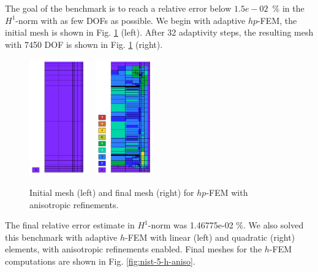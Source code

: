 The goal of the benchmark is to reach a relative error below
$1.5e-02$~\% in the $H^1$-norm with as few DOFs as possible.
We begin with adaptive $hp$-FEM,
the initial mesh is shown in Fig. \ref{fig:nist-5-hp-aniso} (left).
After 32 adaptivity steps, the resulting mesh with 7450 DOF is shown
in Fig. \ref{fig:nist-5-hp-aniso} (right).

\begin{figure}[!ht]
\centering
\includegraphics[height=5cm]{nist/nist-5/mesh_hp_aniso_init.png}\ \
\includegraphics[height=5cm]{nist/nist-5/mesh_hp_aniso.png}
\caption{Initial mesh (left) and final mesh (right) for $hp$-FEM with anisotropic refinements.}
\label{fig:nist-5-hp-aniso}
\end{figure}

The final relative error estimate in $H^1$-norm was 1.46775e-02 \%.
We also solved this benchmark with adaptive $h$-FEM
with linear (left) and quadratic (right)
elements, with anisotropic refinements enabled.
Final meshes for the $h$-FEM computations are shown
in Fig. \ref{fig:nist-5-h-aniso}.

